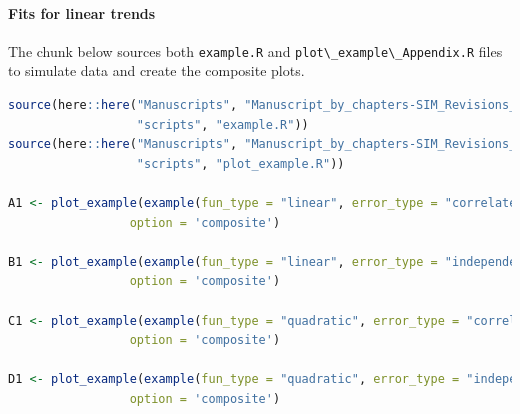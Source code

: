 \documentclass[
]{article}
\newcommand{\passthrough}[1]{#1}
\begin{document}
\hypertarget{fits-for-linear-trends}{%
\paragraph{Fits for linear trends}\label{fits-for-linear-trends}}

The chunk below sources both \passthrough{\lstinline!example.R!} and \passthrough{\lstinline!plot\_example\_Appendix.R!} files to simulate data and create the composite plots.

\begin{lstlisting}[language=R]
source(here::here("Manuscripts", "Manuscript_by_chapters-SIM_Revisions_final", 
                  "scripts", "example.R"))
source(here::here("Manuscripts", "Manuscript_by_chapters-SIM_Revisions_final", 
                  "scripts", "plot_example.R"))

A1 <- plot_example(example(fun_type = "linear", error_type = "correlated"),
                 option = 'composite') 

B1 <- plot_example(example(fun_type = "linear", error_type = "independent"),
                 option = 'composite') 

C1 <- plot_example(example(fun_type = "quadratic", error_type = "correlated"), 
                 option = 'composite') 

D1 <- plot_example(example(fun_type = "quadratic", error_type = "independent"), 
                 option = 'composite') 
\end{lstlisting}
\end{document}

